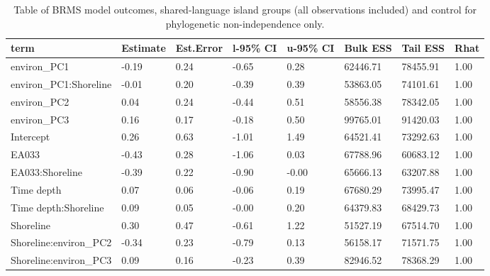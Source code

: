 \begin{table}[ht]
\centering
\begin{tabular}{p{3cm}p{1.35cm}p{1.35cm}p{1.35cm}p{1.35cm}p{1.35cm}p{1.35cm}p{1.35cm}}
  \toprule
term & Estimate & Est.Error & l-95\% CI & u-95\% CI & Bulk ESS & Tail ESS & Rhat \\ 
  \midrule
environ\_PC1 & -0.19 & 0.24 & -0.65 & 0.28 & 62446.71 & 78455.91 & 1.00 \\ 
  environ\_PC1:Shoreline & -0.01 & 0.20 & -0.39 & 0.39 & 53863.05 & 74101.61 & 1.00 \\ 
  environ\_PC2 & 0.04 & 0.24 & -0.44 & 0.51 & 58556.38 & 78342.05 & 1.00 \\ 
  environ\_PC3 & 0.16 & 0.17 & -0.18 & 0.50 & 99765.01 & 91420.03 & 1.00 \\ 
  Intercept & 0.26 & 0.63 & -1.01 & 1.49 & 64521.41 & 73292.63 & 1.00 \\ 
  EA033 & -0.43 & 0.28 & -1.06 & 0.03 & 67788.96 & 60683.12 & 1.00 \\ 
  EA033:Shoreline & -0.39 & 0.22 & -0.90 & -0.00 & 65666.13 & 63207.88 & 1.00 \\ 
  Time depth & 0.07 & 0.06 & -0.06 & 0.19 & 67680.29 & 73995.47 & 1.00 \\ 
  Time depth:Shoreline & 0.09 & 0.05 & -0.00 & 0.20 & 64379.83 & 68429.73 & 1.00 \\ 
  Shoreline & 0.30 & 0.47 & -0.61 & 1.22 & 51527.19 & 67514.70 & 1.00 \\ 
  Shoreline:environ\_PC2 & -0.34 & 0.23 & -0.79 & 0.13 & 56158.17 & 71571.75 & 1.00 \\ 
  Shoreline:environ\_PC3 & 0.09 & 0.16 & -0.23 & 0.39 & 82946.52 & 78368.29 & 1.00 \\ 
   \bottomrule
\end{tabular}
\caption{Table of BRMS model outcomes, shared-language island groups (all observations included) and control for phylogenetic non-independence only.} 
\label{BRMS_effects_medium_control_phylo}
\end{table}

